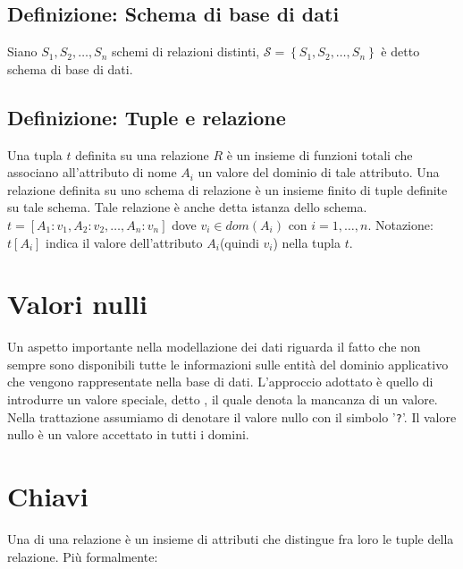 \documentclass[12pt, a4paper]{report}
\begin{document}
            \subsection{Definizione: Schema di base di dati}
                Siano $S_{1},S_{2},\ldots,S_{n}$ schemi di relazioni distinti, $\mathcal{S}=\left\{S_{1},S_{2},\ldots,S_{n}\right\}$ è detto schema di base di dati.
            \subsection{Definizione: Tuple e relazione}
                Una tupla $t$ definita su una relazione $R$ è un insieme di funzioni totali che associano all'attributo di nome $A_{i}$ un valore del dominio di tale attributo. Una relazione definita su uno schema di relazione è un insieme finito di tuple definite su tale schema. Tale relazione è anche detta istanza dello schema. $t=\left[A_{1}:v_{1},A_{2}:v_{2},\ldots,A_{n}:v_{n}\right]$ dove $v_{i}\in dom(A_{i}) \text{ con } i=1,\ldots,n$. Notazione: $t[A_{i}]$ indica il valore dell'attributo $A_{i}$(quindi $v_{i}$) nella tupla $t$.
        \section{Valori nulli}
            Un aspetto importante nella modellazione dei dati riguarda il fatto che non sempre sono disponibili tutte le informazioni sulle entità del dominio applicativo che vengono rappresentate nella base di dati. L'approccio adottato è quello di introdurre un valore speciale, detto , il quale denota la mancanza di un valore.\\
            Nella trattazione assumiamo di denotare il valore nullo con il simbolo '\texttt{?}'. Il valore nullo è un valore accettato in tutti i domini.
        \section{Chiavi}
            Una  di una relazione è un insieme di attributi che distingue fra loro le tuple della relazione. Più formalmente:
\end{document}
